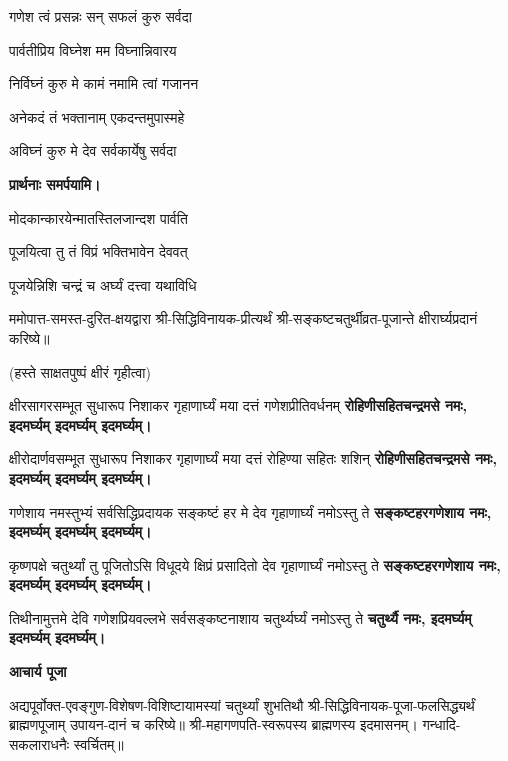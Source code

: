 \begin{center}
{गणेश त्वं प्रसन्नः सन् सफलं कुरु सर्वदा}

{पार्वतीप्रिय विघ्नेश मम विघ्नान्निवारय} 

{निर्विघ्नं कुरु मे कामं नमामि त्वां गजानन}

{अनेकदं तं भक्तानाम् एकदन्तमुपास्महे}

{अविघ्नं कुरु मे देव सर्वकार्येषु सर्वदा}

\textbf{प्रार्थनाः समर्पयामि।}

{मोदकान्कारयेन्मातस्तिलजान्दश पार्वति}

{पूजयित्वा तु तं विप्रं भक्तिभावेन देववत्}

{पूजयेन्निशि चन्द्रं च अर्घ्यं दत्त्वा यथाविधि}


\resetShloka
ममोपात्त-समस्त-दुरित-क्षयद्वारा श्री-सिद्धिविनायक-प्रीत्यर्थं श्री-सङ्कष्टचतुर्थीव्रत-पूजान्ते क्षीरार्घ्यप्रदानं करिष्ये॥

(हस्ते साक्षतपुष्पं क्षीरं गृहीत्वा)

\twolineshloka
{क्षीरसागरसम्भूत सुधारूप निशाकर}
{गृहाणार्घ्यं मया दत्तं गणेशप्रीतिवर्धनम्}
\textbf{रोहिणीसहितचन्द्रमसे नमः, इदमर्घ्यम् इदमर्घ्यम् इदमर्घ्यम्।}

\twolineshloka
{क्षीरोदार्णवसम्भूत सुधारूप निशाकर}
{गृहाणार्घ्यं मया दत्तं रोहिण्या सहितः शशिन्}
\textbf{रोहिणीसहितचन्द्रमसे नमः, इदमर्घ्यम् इदमर्घ्यम् इदमर्घ्यम्।}

\twolineshloka
{गणेशाय नमस्तुभ्यं सर्वसिद्धिप्रदायक}
{सङ्कष्टं हर मे देव गृहाणार्घ्यं नमोऽस्तु ते}
\textbf{सङ्कष्टहरगणेशाय नमः, इदमर्घ्यम् इदमर्घ्यम् इदमर्घ्यम्।}

\twolineshloka
{कृष्णपक्षे चतुर्थ्यां तु पूजितोऽसि विधूदये}
{क्षिप्रं प्रसादितो देव गृहाणार्घ्यं नमोऽस्तु ते}
\textbf{सङ्कष्टहरगणेशाय नमः, इदमर्घ्यम् इदमर्घ्यम् इदमर्घ्यम्।}

\twolineshloka
{तिथीनामुत्तमे देवि गणेशप्रियवल्लभे}
{सर्वसङ्कष्टनाशाय चतुर्थ्यर्घ्यं नमोऽस्तु ते}
\textbf{चतुर्थ्यै नमः, इदमर्घ्यम् इदमर्घ्यम् इदमर्घ्यम्।}


\centerline{\textbf{आचार्य पूजा}}

अद्यपूर्वोक्त-एवङ्गुण-विशेषण-विशिष्टायामस्यां चतुर्थ्यां शुभतिथौ श्री-सिद्धिविनायक-पूजा-फलसिद्ध्यर्थं ब्राह्मणपूजाम् उपायन-दानं च करिष्ये॥ 
श्री-महागणपति-स्वरूपस्य ब्राह्मणस्य इदमासनम्। गन्धादि-सकलाराधनैः स्वर्चितम्॥


\end{center}
